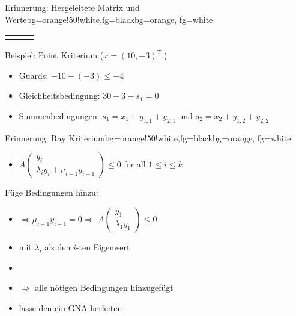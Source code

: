 \begin{frame}
\begin{variableblock}{Erinnerung: Hergeleitete Matrix und Werte}{bg=orange!50!white,fg=black}{bg=orange, fg=white}
\begin{tabular}{rll}
			& & \\
		\end{tabular}
	\end{variableblock}
	\vspace*{-.5em}
	\begin{exampleblock}{Beispiel: Point Kriterium ($x=(10, -3)^T$ )}
		\begin{itemize}
			\item Guards: $-10-(-3)\le-4$
			\item Gleichheitsbedingung: $30-3-s_1=0$
			\item Summenbedingungen: $s_1= x_1+y_{1,1}+y_{2,1}$ und $s_2=x_2+y_{1,2}+y_{2,2}$
		\end{itemize}
	\end{exampleblock}	
\end{frame}

\begin{frame}
	\begin{variableblock}{Erinnerung: Ray Kriterium}{bg=orange!50!white,fg=black}{bg=orange, fg=white}
		\begin{itemize}
			\setlength{\itemindent}{1cm}
			\item[(ray)] $A\begin{pmatrix} y_i \\ \lambda_i y_i + \mu_{i-1} y_{i-1} \end{pmatrix} \le 0$ for all $1 \le i \le k$
		\end{itemize}
	\end{variableblock}
	F\"uge Bedingungen hinzu:
	\begin{itemize}
		\setlength{\itemindent}{1cm}
		\item[$i=1$:] $\Rightarrow \mu_{i-1}y_{i-1}=0 \Rightarrow $ $A\begin{pmatrix} y_1 \\ \lambda_1 y_1 \end{pmatrix} \le 0$
		\item[$i>1$:] mit $\lambda_i$ als den $i$-ten Eigenwert
		\item[]
		\item[] $\Rightarrow$ alle n\"otigen Bedingungen  hinzugef\"ugt\checkmark
		\item[] lasse den \solver ein GNA herleiten
	\end{itemize}	
\end{frame}

